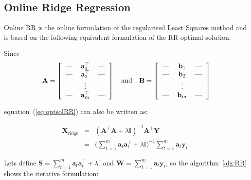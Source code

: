 \subsection{Online Ridge Regression}

Online RR is the online formulation of the regularised Least Squares method
and is based on the following equivalent formulation of the RR optimal solution.

Since 
\begin{equation}
\label{eq:notation}
	\mathbf{A} = 
\left[
  \begin{tabular}{c>{$}c<{$}c}
    --- & \mathbf{a}^{\top}_{1} & ---\\
    --- & \mathbf{a}^{\top}_{2} & ---\\
    & \vdots & \\
    --- & \mathbf{a}^{\top}_{m} & ---
  \end{tabular}
\right]
\quad \text{and} \quad
\mathbf{B} =
\left[
  \begin{tabular}{c>{$}c<{$}c}
    --- & \mathbf{b}_{1} & ---\\
    --- & \mathbf{b}_{2} & ---\\
    & \vdots & \\
    --- & \mathbf{b}_{m} & ---
  \end{tabular}
\right]
\end{equation}

\noindent equation~(\ref{eq:optsolRR}) can also be written as: 

\begin{eqnarray*}
\label{eq:RReapand}
\mathbf{\mathbf{X}}_{\text{ridge}}&=&(\mathbf{A}^\top \mathbf{A}+ \lambda
\mathbb{I})^{-1}\mathbf{A}^\top \mathbf{Y} \\
&=& \displaystyle \big (\sum_{t=1}^m
\mathbf{a}_t \mathbf{a}_t  ^\top + \lambda \mathbb{I}\big )^{-1}
\sum_{t=1}^m \mathbf{a}_t \mathbf{y}_t \, .
\end{eqnarray*}

Lets define $\displaystyle\mathbf{S}= \sum_{t=1}^m \mathbf{a}_t
\mathbf{a}_t  ^\top + \lambda \mathbb{I} $ and $\mathbf{W}=
\displaystyle\sum_{t=1}^m \mathbf{a}_t \mathbf{y}_t$, so the
algorithm~\ref{alg:RR} shows the iterative formulation:

